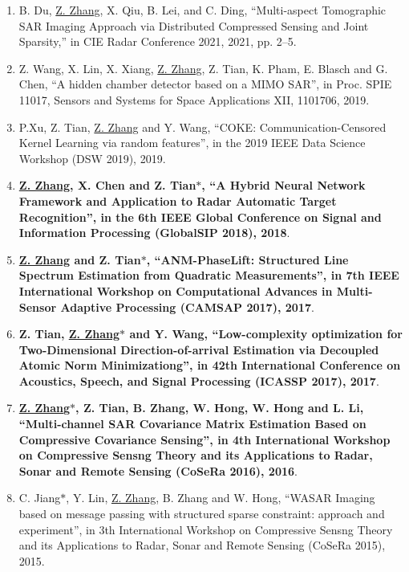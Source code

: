 \documentclass[paper=a4,fontsize=11pt]{scrartcl}
\begin{document}
\begin{enumerate}
	\item B. Du, \underline{Z. Zhang}, X. Qiu, B. Lei, and C. Ding, ``Multi-aspect Tomographic SAR Imaging Approach via Distributed Compressed Sensing and Joint Sparsity,'' in CIE Radar Conference 2021, 2021, pp. 2–5.
	
	\item {Z. Wang, X. Lin, X. Xiang, \underline{Z. Zhang}, Z. Tian, K. Pham, E. Blasch and G. Chen, ``A hidden chamber detector based on a MIMO SAR'', in Proc. SPIE 11017, Sensors and Systems for Space Applications XII, 1101706, 2019}.
	
	\item {P.Xu, Z. Tian, \underline{Z. Zhang} and Y. Wang, ``COKE: Communication-Censored Kernel Learning via random features'', in the 2019 IEEE Data Science Workshop (DSW 2019), 2019}.
	
	\item \textbf{\underline{Z. Zhang}, X. Chen and Z. Tian$\ast$, ``A Hybrid Neural Network Framework and Application to Radar Automatic Target Recognition'', in the 6th IEEE Global Conference on Signal and Information Processing (GlobalSIP 2018), 2018}.
	
	\item \textbf{\underline{Z. Zhang} and Z. Tian$\ast$, ``ANM-PhaseLift: Structured Line Spectrum Estimation from Quadratic Measurements'', in 7th IEEE International Workshop on Computational Advances in Multi-Sensor Adaptive Processing (CAMSAP 2017), 2017}.
	
	\item \textbf{Z. Tian, \underline{Z. Zhang$\ast$} and Y. Wang, ``Low-complexity optimization for Two-Dimensional Direction-of-arrival Estimation via Decoupled Atomic Norm Minimizationg'', in 42th International Conference on Acoustics, Speech, and Signal Processing (ICASSP 2017), 2017}.
	
	\item \textbf{\underline{Z. Zhang$\ast$}, Z. Tian, B. Zhang, W. Hong, W. Hong and L. Li, ``Multi-channel SAR Covariance Matrix Estimation Based on Compressive Covariance Sensing'', in 4th International Workshop on Compressive Sensng Theory and its Applications to Radar, Sonar and Remote Sensing (CoSeRa 2016), 2016}.
	
	\item C. Jiang$\ast$, Y. Lin, \underline{Z. Zhang}, B. Zhang and W. Hong, ``WASAR Imaging based on message passing with structured sparse constraint: approach and experiment'', in 3th International Workshop on Compressive Sensng Theory and its Applications to Radar, Sonar and Remote Sensing (CoSeRa 2015), 2015.
	

\end{enumerate}
\end{document}
